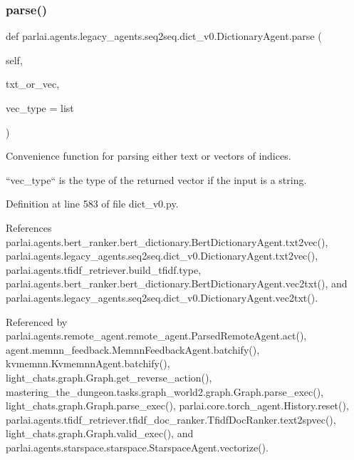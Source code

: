 \subsubsection{\texorpdfstring{parse()}{parse()}}
{\footnotesize\ttfamily def parlai.\+agents.\+legacy\+\_\+agents.\+seq2seq.\+dict\+\_\+v0.\+Dictionary\+Agent.\+parse (\begin{DoxyParamCaption}\item[{}]{self,  }\item[{}]{txt\+\_\+or\+\_\+vec,  }\item[{}]{vec\+\_\+type = {\ttfamily list} }\end{DoxyParamCaption})}

\begin{DoxyVerb}Convenience function for parsing either text or vectors of indices.

``vec_type`` is the type of the returned vector if the input is a string.
\end{DoxyVerb}
 

Definition at line 583 of file dict\+\_\+v0.\+py.



References parlai.\+agents.\+bert\+\_\+ranker.\+bert\+\_\+dictionary.\+Bert\+Dictionary\+Agent.\+txt2vec(), parlai.\+agents.\+legacy\+\_\+agents.\+seq2seq.\+dict\+\_\+v0.\+Dictionary\+Agent.\+txt2vec(), parlai.\+agents.\+tfidf\+\_\+retriever.\+build\+\_\+tfidf.\+type, parlai.\+agents.\+bert\+\_\+ranker.\+bert\+\_\+dictionary.\+Bert\+Dictionary\+Agent.\+vec2txt(), and parlai.\+agents.\+legacy\+\_\+agents.\+seq2seq.\+dict\+\_\+v0.\+Dictionary\+Agent.\+vec2txt().



Referenced by parlai.\+agents.\+remote\+\_\+agent.\+remote\+\_\+agent.\+Parsed\+Remote\+Agent.\+act(), agent.\+memnn\+\_\+feedback.\+Memnn\+Feedback\+Agent.\+batchify(), kvmemnn.\+Kvmemnn\+Agent.\+batchify(), light\+\_\+chats.\+graph.\+Graph.\+get\+\_\+reverse\+\_\+action(), mastering\+\_\+the\+\_\+dungeon.\+tasks.\+graph\+\_\+world2.\+graph.\+Graph.\+parse\+\_\+exec(), light\+\_\+chats.\+graph.\+Graph.\+parse\+\_\+exec(), parlai.\+core.\+torch\+\_\+agent.\+History.\+reset(), parlai.\+agents.\+tfidf\+\_\+retriever.\+tfidf\+\_\+doc\+\_\+ranker.\+Tfidf\+Doc\+Ranker.\+text2spvec(), light\+\_\+chats.\+graph.\+Graph.\+valid\+\_\+exec(), and parlai.\+agents.\+starspace.\+starspace.\+Starspace\+Agent.\+vectorize().

